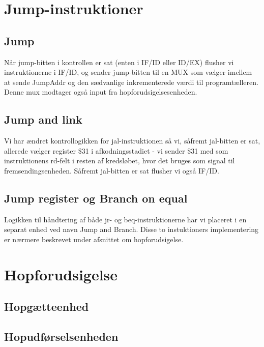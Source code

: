 \documentclass[10pt,a4paper,danish]{article}
\begin{document}
\section{Jump-instruktioner}

\subsection{Jump}
Når jump-bitten i kontrollen er sat (enten i IF/ID eller ID/EX) flusher vi 
instruktionerne i IF/ID, og sender jump-bitten til en MUX som vælger imellem
at sende JumpAddr og den sædvanlige inkrementerede værdi til programtælleren.
Denne mux modtager også input fra hopforudsigelsesenheden. 

\subsection{Jump and link}
Vi har ændret kontrollogikken for jal-instruktionen så vi, såfremt
jal-bitten er sat, allerede vælger register \$31 i afkodningsstadiet
 - vi sender \$31 med som instruktionens rd-felt i resten af kredsløbet,
hvor det bruges som signal til fremsendingsenheden. Såfremt jal-bitten 
er sat flusher vi også IF/ID. 

\subsection{Jump register og Branch on equal}
Logikken til håndtering af både jr- og beq-instruktionerne har vi 
placeret i en separat enhed ved navn Jump and Branch. Disse to 
instuktioners implementering er nærmere beskrevet under afsnittet
om hopforudsigelse. 

\section{Hopforudsigelse}

\subsection{Hopgætteenhed}

\subsection{Hopudførselsenheden}
\end{document}
